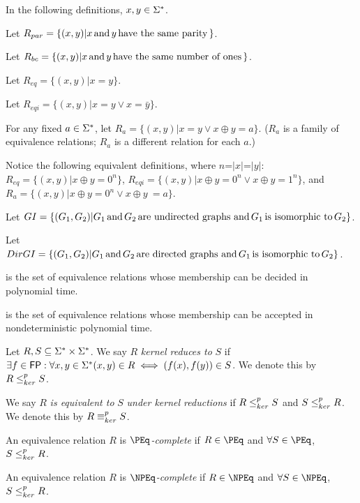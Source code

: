 In the following definitions, $x,y\in\Sigma^{*}$.

Let $R_{par}=\{(x, y)|x \,\text{and}\, y \,\text{have the same parity}\,\}$.

Let $R_{bc}=\{(x, y)|x \,\text{and}\, y \,\text{have the same number of ones}\,\}$.

Let $R_{eq}=\{(x, y)|x = y\}$.

Let $R_{eqi}=\{(x, y)|x = y \lor x = \bar{y}\}$.

For any fixed $a\in\Sigma^{*}$, let $R_{a}=\{(x, y)|x = y \lor x \oplus y =
a\}$. ($R_{a}$ is a family of equivalence relations; $R_{a}$ is a different
relation for each $a$.)

Notice the following equivalent definitions, where $n$=$|x|$=$|y|$:
$R_{eq}=\{(x, y)|x \oplus y = 0^n\}$, $R_{eqi}=\{(x, y)|x \oplus y = 0^n \lor x
\oplus y = 1^n\}$, and $R_{a}=\{(x,y)|x \oplus y = 0^n \lor x \oplus
y\ = a\}$.

Let $GI=\{(G_1, G_2)|G_1 \,\text{and}\, G_2 \,\text{are undirected graphs and}\, G_1
\,\text{is isomorphic to}\, G_2\}$.

Let $DirGI=\{(G_1, G_2)| G_1 \,\text{and}\, G_2 \,\text{are directed graphs and}\,
G_1 \,\text{is isomorphic to}\, G_2\}$.

\begin{definition}\label{def:peq}
  \textit{\PEq} is the set of equivalence relations whose membership can be
  decided in polynomial time.

  \textit{\NPEq} is the set of equivalence relations whose membership can be
  accepted in nondeterministic polynomial time.
\end{definition}

\begin{definition}\label{def:kr}
  Let $R,S\subseteq\Sigma^{*}\times\Sigma^{*}$. We say $R$ \textit{kernel
  reduces to} $S$ if $\exists f\in{\ensuremath{\mathsf{FP}}}:\forall x,y\in\Sigma^{*} (x, y)\in R \iff
  (f(x),f(y))\in S$. We denote this by $R\leq^{p}_{ker} S$.
  
  We say $R$ \textit{is equivalent to} $S$ \textit{under kernel
  reductions} if $R\leq^{p}_{ker} S$ and $S\leq^{p}_{ker} R$. We denote this by $R\equiv^{p}_{ker}
  S$.
\end{definition}

\begin{definition}\label{def:kernel_complete}
  An equivalence relation $R$ is \textit{$\PEq$-complete} if $R\in\PEq$ and
  $\forall S\in\PEq$, $S\leq^{p}_{ker} R$.

  An equivalence relation $R$ is \textit{$\NPEq$-complete} if $R\in\NPEq$ and
  $\forall S\in\NPEq$, $S\leq^{p}_{ker} R$.
\end{definition}
